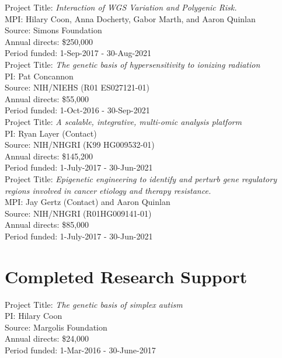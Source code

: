 \documentclass[margin,line]{cv}
\begin{document}
\begin{resume}
    Project Title: \textit{Interaction of WGS Variation and Polygenic Risk.} \\
    MPI: Hilary Coon, Anna Docherty, Gabor Marth, and Aaron Quinlan \\
    Source: Simons Foundation \\
    Annual directs: \$250,000 \\
    Period funded: 1-Sep-2017 - 30-Aug-2021 \\

    Project Title: \textit{The genetic basis of hypersensitivity to ionizing radiation} \\
    PI: Pat Concannon \\
    Source: NIH/NIEHS (R01 ES027121-01) \\
    Annual directs: \$55,000 \\
    Period funded: 1-Oct-2016 - 30-Sep-2021 \\

    Project Title: \textit{A scalable, integrative, multi-omic analysis platform} \\
    PI: Ryan Layer (Contact) \\
    Source: NIH/NHGRI (K99 HG009532-01) \\
    Annual directs: \$145,200 \\
    Period funded: 1-July-2017 - 30-Jun-2021 \\

    Project Title: \textit{Epigenetic engineering to identify and perturb gene regulatory regions involved in cancer etiology and therapy resistance.} \\
    MPI: Jay Gertz (Contact) and Aaron Quinlan \\
    Source: NIH/NHGRI (R01HG009141-01) \\
    Annual directs: \$85,000 \\
    Period funded: 1-July-2017 - 30-Jun-2021 \\

    \section{\mysidestyle Completed Research Support}

    Project Title: \textit{The genetic basis of simplex autism} \\
    PI: Hilary Coon \\
    Source: Margolis Foundation \\
    Annual directs: \$24,000 \\
    Period funded: 1-Mar-2016 - 30-June-2017 \\


\end{resume}
\end{document}
